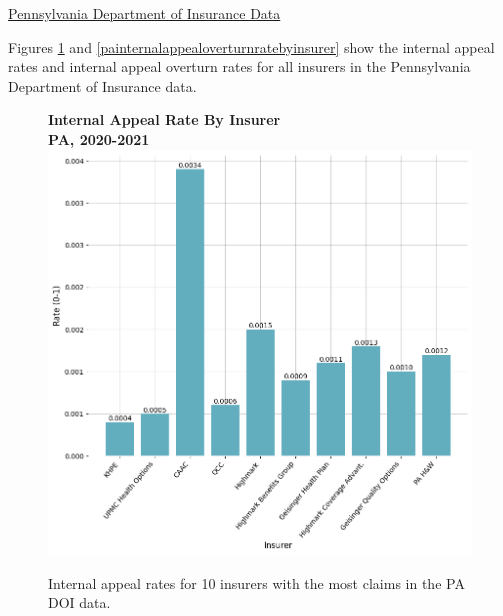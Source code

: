 \documentclass[12pt, a4paper,twoside,parskip=full]{report}
\theoremstyle{plain} %
\theoremstyle{definition} %
\theoremstyle{remark} %
\numberwithin{equation}{chapter}
\begin{document}
		\clearpage
		
		
		\underline{Pennsylvania Department of Insurance Data}

		Figures \ref{painternalappealratebyinsurer} and \ref{painternalappealoverturnratebyinsurer} show the internal appeal rates and internal appeal overturn rates for all insurers in the Pennsylvania Department of Insurance data.
		
		\begin{figure}[h!]
			\centering
			\textbf{Internal Appeal Rate By Insurer}\\
			\textbf{PA, 2020-2021}\\
			\includegraphics[width=.8\columnwidth]{images/pa_claims/appeal_rate_by_insurer.png}
			\caption{Internal appeal rates for 10 insurers with the most claims in the PA DOI data.}
			\label{painternalappealratebyinsurer}
		\end{figure}
		
\end{document}
